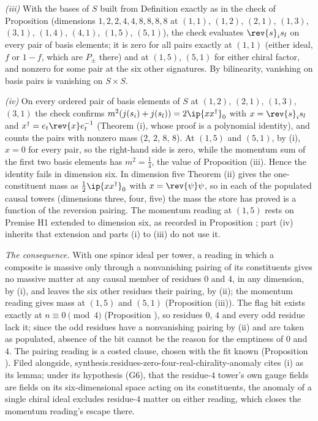 \emph{(iii)} With the bases of $S$ built from Definition  exactly as in the check of Proposition  (dimensions $1, 2, 2, 4, 4, 8, 8, 8, 8$ at $(1,1)$, $(1,2)$, $(2,1)$, $(1,3)$, $(3,1)$, $(1,4)$, $(4,1)$, $(1,5)$, $(5,1)$), the check evaluates $\rev{s}_{i}s_{l}$ on every pair of basis elements; it is zero for all pairs exactly at $(1,1)$ (either ideal, $f$ or $1 - f$, which are $P_{\pm}$ there) and at $(1,5)$, $(5,1)$ for either chiral factor, and nonzero for some pair at the six other signatures. By bilinearity, vanishing on basis pairs is vanishing on $S \times S$.

\emph{(iv)} On every ordered pair of basis elements of $S$ at $(1,2)$, $(2,1)$, $(1,3)$, $(3,1)$ the check confirms $m^{2}(j(s_{i}) + j(s_{l})) = 2\ip{xx^{\dagger}}_{0}$ with $x = \rev{s}_{i}s_{l}$ and $x^{\dagger} = e_{t}\rev{x}e_{t}^{-1}$ (Theorem (i), whose proof is a polynomial identity), and counts the pairs with nonzero mass ($2$, $2$, $8$, $8$). At $(1,5)$ and $(5,1)$, by (i), $x = 0$ for every pair, so the right-hand side is zero, while the momentum sum of the first two basis elements has $m^{2} = \tfrac14$, the value of Proposition (iii). Hence the identity fails in dimension six. In dimension five Theorem (ii) gives the one-constituent mass as $\tfrac12\ip{xx^{\dagger}}_{0}$ with $x = \rev{\psi}\psi$, so in each of the populated causal towers (dimensions three, four, five) the mass the store has proved is a function of the reversion pairing. The momentum reading at $(1,5)$ rests on Premise H1 extended to dimension six, as recorded in Proposition ; part (iv) inherits that extension and parts (i) to (iii) do not use it.

\emph{The consequence.} With one spinor ideal per tower, a reading in which a composite is massive only through a nonvanishing pairing of its constituents gives no massive matter at any causal member of residues $0$ and $4$, in any dimension, by (i), and leaves the six other residues their pairing, by (ii); the momentum reading gives mass at $(1,5)$ and $(5,1)$ (Proposition (iii)). The flag bit exists exactly at $n \equiv 0 \pmod 4$ (Proposition ), so residues $0$, $4$ and every odd residue lack it; since the odd residues have a nonvanishing pairing by (ii) and are taken as populated, absence of the bit cannot be the reason for the emptiness of $0$ and $4$. The pairing reading is a costed clause, chosen with the fit known (Proposition ). Filed alongside, synthesis.residues-zero-four-real-chirality-anomaly cites (i) as its lemma; under its hypothesis (G6), that the residue-$4$ tower's own gauge fields are fields on its six-dimensional space acting on its constituents, the anomaly of a single chiral ideal excludes residue-$4$ matter on either reading, which closes the momentum reading's escape there.

